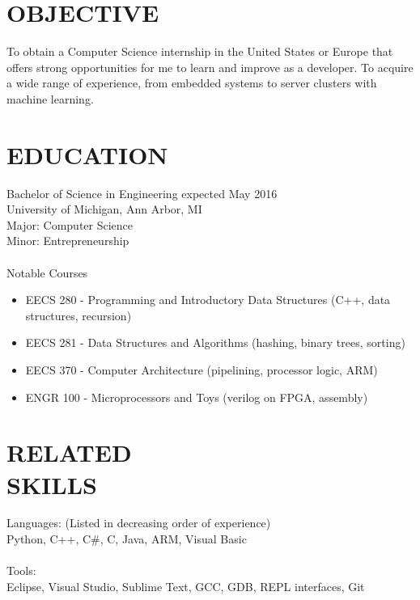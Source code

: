 \documentclass[line,margin]{res}
\begin{document}

\color{HeaderColor}
\address{ajlj@umich.edu -- 248-622-7017}
\address{Citizen of the United States and Italy}
 
 \renewcommand{\labelitemi}{$-$}
 
\begin{resume}
\color{black}
\section{\textcolor{HeaderColor}{OBJECTIVE}}
				To obtain a Computer Science internship in the United States or Europe that offers strong opportunities for me to learn and improve as a developer. To acquire a wide range of experience, from embedded systems to server clusters with machine learning.

\section{\textcolor{HeaderColor}{EDUCATION}} {\sc Bachelor of Science in Engineering} \hfill expected May 2016\\
				University of Michigan, Ann Arbor, MI \\
                Major: Computer Science \\
                Minor: Entrepreneurship \\ \\
                {\sc Notable Courses}
                \begin{itemize} \itemsep0em
                \item EECS 280 - Programming and Introductory Data Structures (C++, data structures, recursion)
                \item EECS 281 - Data Structures and Algorithms (hashing, binary trees, sorting)
                \item EECS 370 - Computer Architecture (pipelining, processor logic, ARM)
                \item ENGR 100 - Microprocessors and Toys (verilog on FPGA, assembly) 
                \end{itemize}
 
 
\section{\textcolor{HeaderColor}{RELATED \\ SKILLS}} 
				{\sc Languages: (Listed in decreasing order of experience)} \\
				Python, C++, C\#, C, Java, ARM, Visual Basic \\ \\
                {\sc Tools:} \\
                Eclipse, Visual Studio, Sublime Text, GCC, GDB, REPL interfaces, Git
 

\end{resume}
\end{document}
